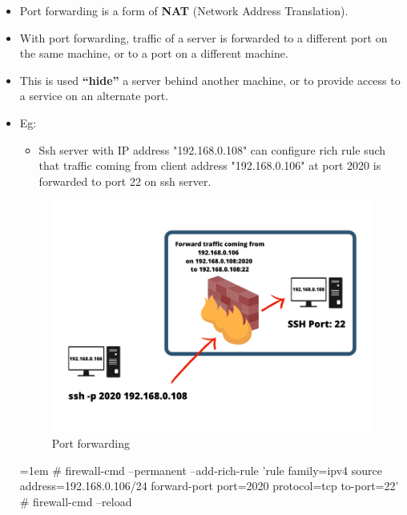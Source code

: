 
\begin{flushleft}

\begin{itemize}
	\item Port forwarding is a form of \textbf{NAT} (Network Address Translation). 
	\item With port forwarding, traffic of a server is forwarded to a different port on the same machine, or to a port on a different machine. 
	\item This is used \textbf{“hide”} a server behind another machine, or to provide access to a service on an alternate port.
	\item Eg: 
	\begin{itemize}
		\item Ssh server with IP address "192.168.0.108" can configure rich rule such that traffic coming from client address "192.168.0.106" at port 2020 is forwarded to port 22 on ssh server.
	\end{itemize}
	\begin{figure}[h!]
		\centering
		\includegraphics[scale=.52]{content/chapter2/images/port.png}
		\caption{Port forwarding}
		\label{fig:command_prompt12}
	\end{figure}
	
	\begin{tcolorbox}[breakable,notitle,boxrule=-0pt,colback=black,colframe=black]
			\color{green}
			\font=1em
			\# firewall-cmd --permanent --add-rich-rule 'rule family=ipv4 source address=192.168.0.106/24 forward-port port=2020 protocol=tcp to-port=22'
			\newline
			\newline
			\# firewall-cmd --reload
			\font=4pt
	\end{tcolorbox}
		
	
\end{itemize}

	
\end{flushleft}

\newpage





